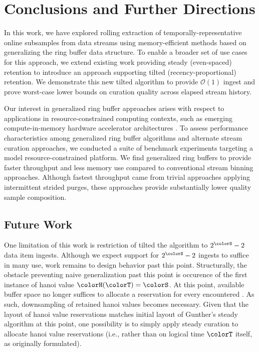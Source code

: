 \section{Conclusions and Further Directions} \label{sec:conclusion}

In this work, we have explored rolling extraction of temporally-representative online subsamples from data streams using memory-efficient methods based on generalizing the ring buffer data structure.
To enable a broader set of use cases for this approach, we extend existing work providing steady (even-spaced) retention \citep{gunther2014compressing} to introduce an approach supporting tilted (recency-proportional) retention.
We demonstrate this new tilted algorithm to provide $\mathcal{O}(1)$ ingest and prove worst-case lower bounds on curation quality across elapsed stream history.

Our interest in generalized ring buffer approaches arises with respect to applications in resource-constrained computing contexts, such as emerging compute-in-memory hardware accelerator architectures \citep{lie2023cerebras,vasiljevic2021compute}.
To assess performance characteristics among generalized ring buffer algorithms and alternate stream curation approaches, we conducted a suite of benchmark experiments targeting a model resource-constrained platform.
We find generalized ring buffers to provide faster throughput and less memory use compared to conventional stream binning approaches.
Although fastest throughput came from trivial approaches applying intermittent strided purges, these approaches provide substantially lower quality sample composition.

\subsection{Future Work}

One limitation of this work is restriction of tilted the algorithm to $2^{\colorS} - 2$ data item ingests.
Although we expect support for $2^{\colorS} - 2$ ingests to suffice in many use, work remains to design behavior past this point.
Structurally, the obstacle preventing naive generalization past this point is occurence of the first instance of hanoi value $\colorH(\colorT) = \colorS$.
At this point, available buffer space no longer suffices to allocate a reservation for every encountered \hv{}.
As such, downsampling of retained hanoi values becomes necessary.
Given that the layout of hanoi value reservations matches initial layout of Gunther's steady algorithm at this point, one possibility is to simply apply steady curation to allocate hanoi value reservations (i.e., rather than on logical time $\colorT$ itself, as originally formulated).

